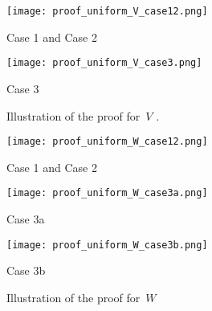 \documentclass[10pt,reqno]{amsart}
\newcommand{\0}{{\ve 0}}
\theoremstyle{definition}
\begin{document}
\begin{figure}[hp]
\begin{minipage}{.5\textwidth}
\texttt{[image: proof\_uniform\_V\_case12.png]}
\par\centering
  Case 1 and Case 2
\end{minipage}
\hfill
\begin{minipage}{.4\textwidth}
\texttt{[image: proof\_uniform\_V\_case3.png]}
\par\centering
  Case 3
\end{minipage}
\caption{Illustration of the proof %
  for~$V$%
  .}
\label{fig:V-from-U}
\end{figure}

\begin{figure}[hp]
\begin{minipage}{.4\textwidth}
\texttt{[image: proof\_uniform\_W\_case12.png]}
\par\centering
  Case 1 and Case 2
\par\vspace{20ex}
\end{minipage}
\hfill
\begin{minipage}{.55\textwidth}
\texttt{[image: proof\_uniform\_W\_case3a.png]}
\par{\centering
  Case 3a
\par\vspace{8ex}}
\texttt{[image: proof\_uniform\_W\_case3b.png]}
\par\centering
  Case 3b
\end{minipage}
\caption{Illustration of the proof %
  for~$W$%
}
\label{fig:W-from-U}
\end{figure}
\end{document}
